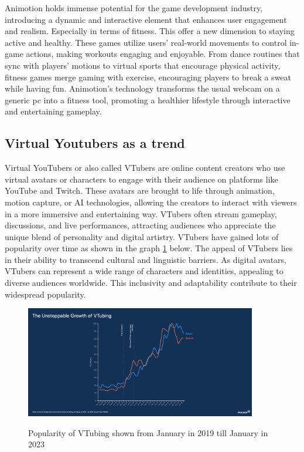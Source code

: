 Animotion holds immense potential for the game development industry, introducing a dynamic and interactive element that enhances user engagement and realism. Especially 
in terms of fitness. This offer a new dimension to staying active and healthy. These games utilize users' real-world movements to control 
in-game actions, making workouts engaging and enjoyable. From dance routines that sync with players' motions to virtual sports that encourage 
physical activity, fitness games merge gaming with exercise, encouraging players to break a sweat while having fun. Animotion's technology 
transforms the usual webcam on a generic pc into a fitness tool, promoting a healthier lifestyle through interactive and entertaining gameplay.

\subsection{Virtual Youtubers as a trend}
Virtual YouTubers or also called VTubers are online content creators who use virtual avatars or characters to engage with their 
audience on platforms like YouTube and Twitch. These avatars are brought to life through animation, motion capture, 
or AI technologies, allowing the creators to interact with viewers in a more immersive and entertaining way. 
VTubers often stream gameplay, discussions, and live performances, attracting audiences who appreciate the 
unique blend of personality and digital artistry. VTubers have gained lots of popularity over time as shown in the graph \ref{fig:vtubers} below.
The appeal of VTubers lies in their ability to transcend cultural and linguistic barriers. As digital avatars, 
VTubers can represent a wide range of characters and identities, appealing to diverse audiences worldwide. 
This inclusivity and adaptability contribute to their widespread popularity. \cite{vtubing1}
\\
\begin{figure}[htb]
    \centering
    \includegraphics[width=0.9\textwidth]{pics/riseofvtubers.png}
    \caption{Popularity of VTubing shown from January in 2019 till January in 2023}
    \cite{vtubing1}
    \label{fig:vtubers}
\end{figure}
